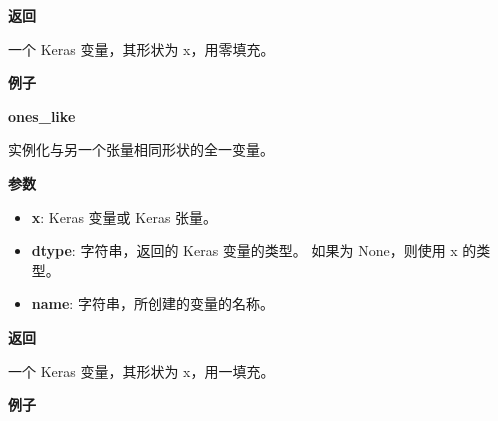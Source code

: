 \textbf{返回}

一个 Keras 变量，其形状为 x，用零填充。

\textbf{例子}

\begin{Shaded}
\begin{Highlighting}[]
\OperatorTok{>>>}    
\OperatorTok{>>>} \OperatorTok{=} \NormalTok{,}\NormalTok{)))}
\OperatorTok{>>>} \OperatorTok{=} 
\OperatorTok{>>>} 
\NormalTok{array([[ }\NormalTok{.],}
       \NormalTok{[ }\NormalTok{.]], dtype}\OperatorTok{=}
\end{Highlighting}
\end{Shaded}


\textbf{ones\_like}\label{onesux5flike}

\begin{Shaded}
\begin{Highlighting}[]
\OperatorTok{=}\OperatorTok{=}\NormalTok{)}
\end{Highlighting}
\end{Shaded}

实例化与另一个张量相同形状的全一变量。

\textbf{参数}

\begin{itemize}
\tightlist
\item
  \textbf{x}: Keras 变量或 Keras 张量。
\item
  \textbf{dtype}: 字符串，返回的 Keras 变量的类型。 如果为 None，则使用
  x 的类型。
\item
  \textbf{name}: 字符串，所创建的变量的名称。
\end{itemize}

\textbf{返回}

一个 Keras 变量，其形状为 x，用一填充。

\textbf{例子}

\begin{Shaded}
\begin{Highlighting}[]
\OperatorTok{>>>}    
\OperatorTok{>>>} \OperatorTok{=} \NormalTok{,}\NormalTok{)))}
\OperatorTok{>>>} \OperatorTok{=} 
\OperatorTok{>>>} 
\NormalTok{array([[ }\NormalTok{.],}
       \NormalTok{[ }\NormalTok{.]], dtype}\OperatorTok{=}
\end{Highlighting}
\end{Shaded}


